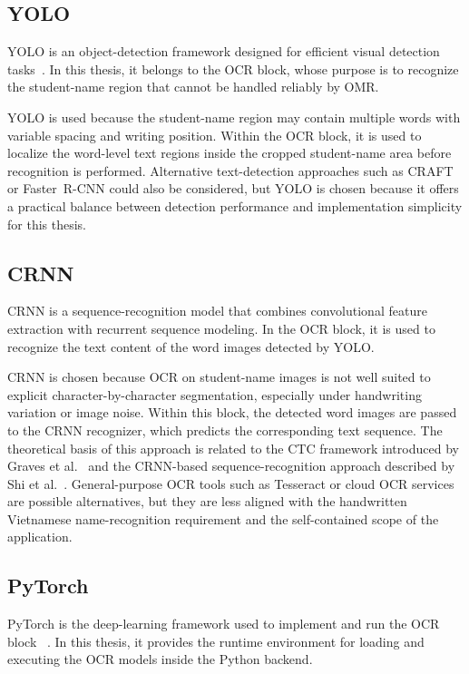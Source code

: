 \documentclass[../Main.tex]{subfiles}
\begin{document}
\subsection{YOLO}
\label{subsection:3.5.1}

YOLO is an object-detection framework designed for efficient visual detection
tasks~\cite{redmon2016yolo}. In this thesis, it belongs to the OCR block, whose
purpose is to recognize the student-name region that cannot be handled
reliably by OMR.

YOLO is used because the student-name region may contain multiple words with
variable spacing and writing position. Within the OCR block, it is used to
localize the word-level text regions inside the cropped student-name area
before recognition is performed. Alternative text-detection approaches such as
CRAFT or Faster~R-CNN could also be considered, but YOLO is chosen because it
offers a practical balance between detection performance and implementation
simplicity for this thesis.

\subsection{CRNN}
\label{subsection:3.5.2}

CRNN is a sequence-recognition model that combines convolutional feature
extraction with recurrent sequence modeling. In the OCR block, it is used to
recognize the text content of the word images detected by YOLO.

CRNN is chosen because OCR on student-name images is not well suited to
explicit character-by-character segmentation, especially under handwriting
variation or image noise. Within this block, the detected word images are
passed to the CRNN recognizer, which predicts the corresponding text sequence.
The theoretical basis of this approach is related to the CTC framework
introduced by Graves et al.~\cite{graves2006ctc} and the CRNN-based
sequence-recognition approach described by Shi et al.~\cite{shi2017crnn}.
General-purpose OCR tools such as Tesseract or cloud OCR services are possible
alternatives, but they are less aligned with the handwritten Vietnamese
name-recognition requirement and the self-contained scope of the application.

\subsection{PyTorch}
\label{subsection:3.5.3}

PyTorch is the deep-learning framework used to implement and run the OCR block
~\cite{paszke2019pytorch}. In this thesis, it provides the runtime environment
for loading and executing the OCR models inside the Python backend.
\end{document}
